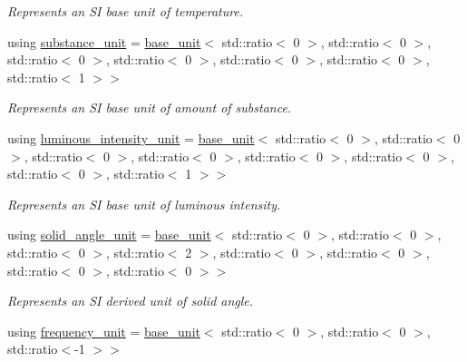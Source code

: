 \begin{DoxyCompactItemize}
\begin{DoxyCompactList}\small\item\em Represents an S\+I base unit of temperature. \end{DoxyCompactList}\item 
\hypertarget{namespaceunits_1_1category_a9603923620ee542573e69d4d16c0ce3e}{}using \hyperlink{namespaceunits_1_1category_a9603923620ee542573e69d4d16c0ce3e}{substance\+\_\+unit} = \hyperlink{structunits_1_1base__unit}{base\+\_\+unit}$<$ std\+::ratio$<$ 0 $>$, std\+::ratio$<$ 0 $>$, std\+::ratio$<$ 0 $>$, std\+::ratio$<$ 0 $>$, std\+::ratio$<$ 0 $>$, std\+::ratio$<$ 0 $>$, std\+::ratio$<$ 1 $>$$>$\label{namespaceunits_1_1category_a9603923620ee542573e69d4d16c0ce3e}

\begin{DoxyCompactList}\small\item\em Represents an S\+I base unit of amount of substance. \end{DoxyCompactList}\item 
\hypertarget{namespaceunits_1_1category_a5a594dba761bc49d85a99a9a03b5f638}{}using \hyperlink{namespaceunits_1_1category_a5a594dba761bc49d85a99a9a03b5f638}{luminous\+\_\+intensity\+\_\+unit} = \hyperlink{structunits_1_1base__unit}{base\+\_\+unit}$<$ std\+::ratio$<$ 0 $>$, std\+::ratio$<$ 0 $>$, std\+::ratio$<$ 0 $>$, std\+::ratio$<$ 0 $>$, std\+::ratio$<$ 0 $>$, std\+::ratio$<$ 0 $>$, std\+::ratio$<$ 0 $>$, std\+::ratio$<$ 1 $>$$>$\label{namespaceunits_1_1category_a5a594dba761bc49d85a99a9a03b5f638}

\begin{DoxyCompactList}\small\item\em Represents an S\+I base unit of luminous intensity. \end{DoxyCompactList}\item 
\hypertarget{namespaceunits_1_1category_ac288b5181dd5ed221d8d070b5d36137d}{}using \hyperlink{namespaceunits_1_1category_ac288b5181dd5ed221d8d070b5d36137d}{solid\+\_\+angle\+\_\+unit} = \hyperlink{structunits_1_1base__unit}{base\+\_\+unit}$<$ std\+::ratio$<$ 0 $>$, std\+::ratio$<$ 0 $>$, std\+::ratio$<$ 0 $>$, std\+::ratio$<$ 2 $>$, std\+::ratio$<$ 0 $>$, std\+::ratio$<$ 0 $>$, std\+::ratio$<$ 0 $>$, std\+::ratio$<$ 0 $>$$>$\label{namespaceunits_1_1category_ac288b5181dd5ed221d8d070b5d36137d}

\begin{DoxyCompactList}\small\item\em Represents an S\+I derived unit of solid angle. \end{DoxyCompactList}\item 
\hypertarget{namespaceunits_1_1category_a5abfda6ffc83788eaab44d80e1acadda}{}using \hyperlink{namespaceunits_1_1category_a5abfda6ffc83788eaab44d80e1acadda}{frequency\+\_\+unit} = \hyperlink{structunits_1_1base__unit}{base\+\_\+unit}$<$ std\+::ratio$<$ 0 $>$, std\+::ratio$<$ 0 $>$, std\+::ratio$<$-\/1 $>$$>$\label{namespaceunits_1_1category_a5abfda6ffc83788eaab44d80e1acadda}


\end{DoxyCompactItemize}
